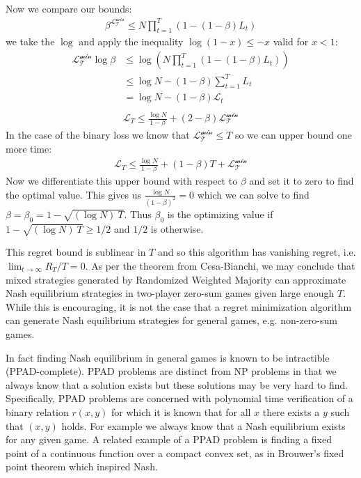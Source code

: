 \documentclass{article}
\begin{document}
Now we compare our bounds:
\begin{align*}
    \beta^\mathcal{L_T^\text{min}} \le N \prod_{t=1}^T (1-(1-\beta)L_t)
\end{align*}
\noindent we take the $\log$ and apply the inequality $\log(1-x) \le -x$ valid for $x<1$:
\begin{align*}
    \mathcal{L_T^\text{min}}\log\beta & \le \log\left(N \prod_{t=1}^T (1-(1-\beta)L_t)\right)\\
    & \le \log N - (1-\beta)\sum_{t=1}^T L_t\\
    & = \log N - (1-\beta) \mathcal{L}_t\\
\end{align*}
\begin{align*}
\mathcal{L}_T \le \frac{\log N}{1-\beta} + (2-\beta)\mathcal{L_T^\text{min}}
\end{align*}
\noindent In the case of the binary loss we know that $\mathcal{L_T^\text{min}} \le T$ so we can upper bound one more time:
\begin{align*}
\mathcal{L}_T \le \frac{\log N}{1-\beta} + (1-\beta)T + \mathcal{L_T^\text{min}}
\end{align*}
\noindent Now we differentiate this upper bound with respect to $\beta$ and set it to zero to find the optimal value. This gives us $\frac{\log N}{(1-\beta)^2} = 0$ which we can solve to find $\beta = \beta_0 = 1 - \sqrt{(\log N)\ T}$. Thus $\beta_0$ is the optimizing value if $1 - \sqrt{(\log N)\ T} \ge 1/2$ and $1/2$ is otherwise.

This regret bound is sublinear in $T$ and so this algorithm has vanishing regret, i.e. $\lim_{t\rightarrow\infty} R_T/T = 0$. As per the theorem from Cesa-Bianchi\cite{cesa2006prediction}, we may conclude that mixed strategies generated by Randomized Weighted Majority can approximate Nash equilibrium strategies in two-player zero-sum games given large enough $T$. While this is encouraging, it is not the case that a regret minimization algorithm can generate Nash equilibrium strategies for general games, e.g. non-zero-sum games. 

In fact finding Nash equilibrium in general games is known to be intractible (PPAD-complete\cite{daskalakis2009complexity}). PPAD problems are distinct from NP problems in that we always know that a solution exists but these solutions may be very hard to find. Specifically, PPAD problems are concerned with polynomial time verification of a binary relation $r(x,y)$ for which it is known that for all $x$ there exists a $y$ such that $(x,y)$ holds. For example we always know that a Nash equilibrium exists for any given game. A related example of a PPAD problem is finding a fixed point of a continuous function over a compact convex set, as in Brouwer's fixed point theorem which inspired Nash.
\end{document}
